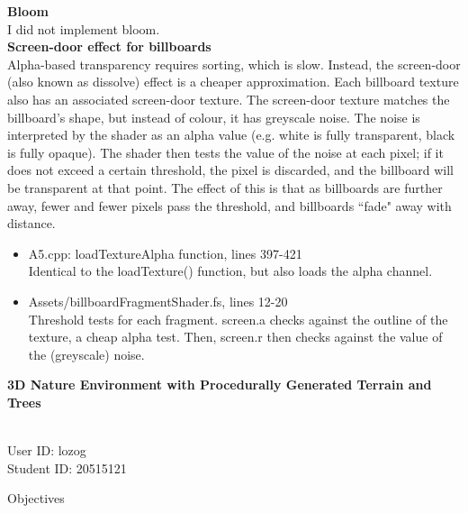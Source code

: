 \documentclass{article}
\newcommand\projecttitle{3D Nature Environment with Procedurally Generated Terrain and Trees}
\newcommand\myname{Liam Ozog}
\newcommand\myuserid{lozog}
\newcommand\mystudentid{20515121}
\begin{document}
	\large\noindent\textbf{Bloom}
	\normalsize
	\\

	I did not implement bloom.
	\\

	\large\noindent\textbf{Screen-door effect for billboards}
	\normalsize
	\\

	Alpha-based transparency requires sorting, which is slow. Instead, the screen-door (also known as dissolve) effect is a cheaper approximation. Each billboard texture also has an associated screen-door texture. The screen-door texture matches the billboard's shape, but instead of colour, it has greyscale noise. The noise is interpreted by the shader as an alpha value (e.g. white is fully transparent, black is fully opaque). The shader then tests the value of the noise at each pixel; if it does not exceed a certain threshold, the pixel is discarded, and the billboard will be transparent at that point. The effect of this is that as billboards are further away, fewer and fewer pixels pass the threshold, and billboards ``fade" away with distance.
	\\

	\begin{itemize}
	\item A5.cpp: loadTextureAlpha function, lines 397-421 \\
	Identical to the loadTexture() function, but also loads the alpha channel.
	\item Assets/billboardFragmentShader.fs, lines 12-20 \\
	Threshold tests for each fragment. screen.a checks against the outline of the texture, a cheap alpha test. Then, screen.r then checks against the value of the (greyscale) noise.
	\end{itemize}


\newpage

{\noindent \huge \bf 
	\projecttitle 
}

\medskip
\noindent{Name: \myname} \\ 
User ID: \myuserid \\ 
Student ID: \mystudentid 

\bigskip
{\noindent\Large Objectives}
\end{document}
